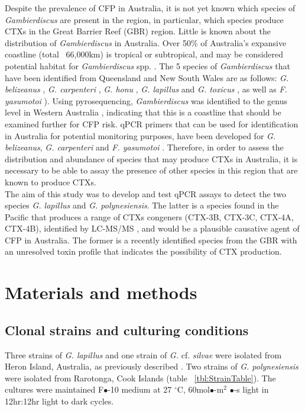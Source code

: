 \documentclass[12pt]{article}
\begin{document}
Despite the prevalence of CFP in Australia, it is not yet known which species of \textit{Gambierdiscus} are present in the region, in particular, which species produce CTXs in the Great Barrier Reef (GBR) region. Little is known about the distribution of \emph{Gambierdiscus} in Australia.
Over 50\% of Australia's expansive coastline (total ~66,000km) is tropical or subtropical, and may be considered potential habitat for \emph{Gambierdiscus} spp. \citep{kretzschmar2016characterization}. 
The 5 species of \emph{Gambierdiscus} that have been identified from Queensland and New South Wales are as follows: \emph{G. belizeanus} \citep{murray2014molecular}, \emph{G. carpenteri} \citep{kohli2014high,sparrow2017effects}, \emph{G. honu} \citep{rhodes2017new}, \emph{G. lapillus} \citep{kretzschmar2016characterization} and \emph{G. toxicus} \citep{hallegraeff2010algae}, as well as \emph{F. yasumotoi}  \citep{murray2014molecular}). Using pyrosequencing, \textit{Gambierdiscus} was identified to the genus level in Western Australia \citep{kohli2014cob}, indicating that this is a coastline that should be examined further for CFP risk. 
qPCR primers that can be used for identification in Australia for potential monitoring purposes, have been developed for \emph{G. belizeanus}, \emph{G. carpenteri} and \emph{F. yasumotoi} \citep{nishimura2016quantitative,vandersea2012development}. Therefore, in order to assess the distribution and abundance of species that may produce CTXs in Australia, it is necessary to be able to assay the presence of other species in this region that are known to produce CTXs.\\ 


The aim of this study was to develop and test qPCR assays to detect the two species \emph{G. lapillus} and \emph{G. polynesiensis}. The latter is a species found in the Pacific that produces a range of CTXs congeners (CTX-3B, CTX-3C, CTX-4A, CTX-4B), identified by LC-MS/MS \citep{rhodes2014production}, and would be a plausible causative agent of CFP in Australia. The former is a recently identified species from the GBR with an unresolved toxin profile that indicates the possibility of CTX production.
\newpage
\section*{Materials and methods}
\subsection*{Clonal strains and culturing conditions}
Three strains of \emph{G. lapillus} 
and one strain of \emph{G.} cf. \emph{silvae} 
were isolated from Heron Island, Australia, as previously described \citep{kretzschmar2016characterization}. Two strains of \emph{G. polynesiensis} were isolated from Rarotonga, Cook Islands (table ~\ref{tbl:StrainTable}). The cultures were maintained F$\bullet$-10 medium at 27 $^{\circ}$C, 60mol$\bullet$-m$^{2}$ $\bullet$-s light in 12hr:12hr light to dark cycles.
\end{document}
